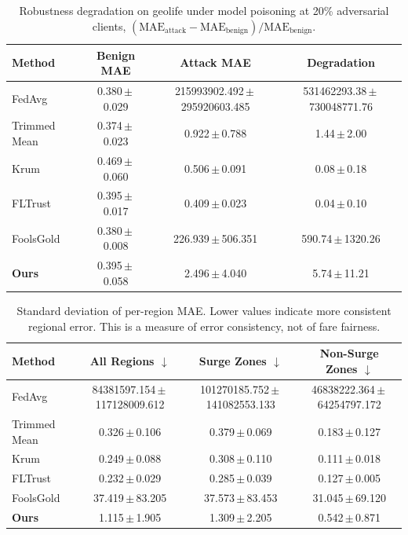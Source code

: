 \begin{table}[t]
\centering
\scriptsize
\caption{Robustness degradation on geolife under model poisoning at 20\% adversarial clients, $(\mathrm{MAE}_{\mathrm{attack}}-\mathrm{MAE}_{\mathrm{benign}})/\mathrm{MAE}_{\mathrm{benign}}$.}
\label{tab:degradation}
\begin{tabular}{lccc}
\toprule
\textbf{Method} & \textbf{Benign MAE} & \textbf{Attack MAE} & \textbf{Degradation} \\
\midrule
FedAvg & 0.380\,$\pm$\,0.029 & 215993902.492\,$\pm$\,295920603.485 & 531462293.38\,$\pm$\,730048771.76 \\
Trimmed Mean & 0.374\,$\pm$\,0.023 & 0.922\,$\pm$\,0.788 & 1.44\,$\pm$\,2.00 \\
Krum & 0.469\,$\pm$\,0.060 & 0.506\,$\pm$\,0.091 & 0.08\,$\pm$\,0.18 \\
FLTrust & 0.395\,$\pm$\,0.017 & 0.409\,$\pm$\,0.023 & 0.04\,$\pm$\,0.10 \\
FoolsGold & 0.380\,$\pm$\,0.008 & 226.939\,$\pm$\,506.351 & 590.74\,$\pm$\,1320.26 \\
\textbf{Ours} & 0.395\,$\pm$\,0.058 & 2.496\,$\pm$\,4.040 & 5.74\,$\pm$\,11.21 \\
\bottomrule
\end{tabular}
\end{table}

\begin{table}[t]
\centering
\scriptsize
\caption{Standard deviation of per-region MAE. Lower values indicate more consistent regional error. This is a measure of error consistency, not of fare fairness.}
\label{tab:fairness}
\renewcommand{\arraystretch}{1.1}
\begin{tabular}{lccc}
\toprule
\textbf{Method} & \textbf{All Regions $\downarrow$} & \textbf{Surge Zones $\downarrow$} & \textbf{Non-Surge Zones $\downarrow$} \\
\midrule
FedAvg & 84381597.154\,$\pm$\,117128009.612 & 101270185.752\,$\pm$\,141082553.133 & 46838222.364\,$\pm$\,64254797.172 \\
Trimmed Mean & 0.326\,$\pm$\,0.106 & 0.379\,$\pm$\,0.069 & 0.183\,$\pm$\,0.127 \\
Krum & 0.249\,$\pm$\,0.088 & 0.308\,$\pm$\,0.110 & 0.111\,$\pm$\,0.018 \\
FLTrust & 0.232\,$\pm$\,0.029 & 0.285\,$\pm$\,0.039 & 0.127\,$\pm$\,0.005 \\
FoolsGold & 37.419\,$\pm$\,83.205 & 37.573\,$\pm$\,83.453 & 31.045\,$\pm$\,69.120 \\
\textbf{Ours} & 1.115\,$\pm$\,1.905 & 1.309\,$\pm$\,2.205 & 0.542\,$\pm$\,0.871 \\
\bottomrule
\end{tabular}
\end{table}

